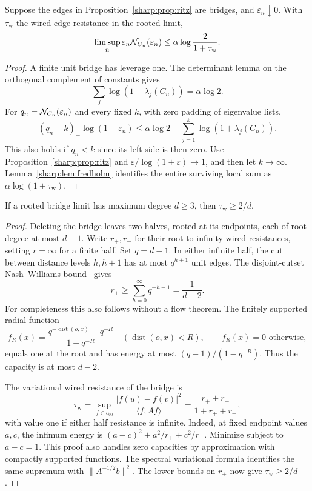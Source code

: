 \begin{theorem}\label{sharp:thm:budget}
Suppose the edges in Proposition~\ref{sharp:prop:ritz} are bridges, and
$\varepsilon_n\downarrow0$. With $\tau_{\mathrm w}$ the wired edge
resistance in the rooted limit,
\begin{equation}\label{sharp:eq:budget}
 \limsup_n\varepsilon_n\mathcal N_{C_n}(\varepsilon_n)
                \le\alpha\log\frac{2}{1+\tau_{\mathrm w}}.
\end{equation}
\end{theorem}
\begin{proof}
A finite unit bridge has leverage one. The determinant lemma on the
orthogonal complement of constants gives
\[
             \sum_j\log(1+\lambda_j(C_n))=\alpha\log2.
\]
For $q_n=\mathcal N_{C_n}(\varepsilon_n)$ and every fixed $k$, with zero
padding of eigenvalue lists,
\[
 (q_n-k)_+\log(1+\varepsilon_n)
    \le\alpha\log2-\sum_{j=1}^k\log(1+\lambda_j(C_n)).
\]
This also holds if $q_n<k$ since its left side is then zero.
Use Proposition~\ref{sharp:prop:ritz} and
$\varepsilon/\log(1+\varepsilon)\to1$, and then let $k\to\infty$.
Lemma~\ref{sharp:lem:fredholm} identifies the entire surviving local sum as
$\alpha\log(1+\tau_{\mathrm w})$.
\end{proof}

\begin{lemma}\label{sharp:lem:resistance}
If a rooted bridge limit has maximum degree $d\ge3$, then
$\tau_{\mathrm w}\ge2/d$.
\end{lemma}
\begin{proof}
Deleting the bridge leaves two halves, rooted at its endpoints, each
of root degree at most $d-1$. Write $r_+,r_-$ for their root-to-infinity
wired resistances, setting $r=\infty$ for a finite half.
Set $q=d-1$. In either infinite half, the cut between distance levels
$h,h+1$ has at most $q^{h+1}$ unit edges. The disjoint-cutset
Nash--Williams bound~\cite[Section 2.5]{LyonsPeres} gives
\[
                 r_\pm\ge\sum_{h=0}^\infty q^{-h-1}
                                =\frac1{d-2}.
\]
For completeness this also follows without a flow theorem. The
finitely supported radial function
\[
 f_R(x)=\frac{q^{-\operatorname{dist}(o,x)}-q^{-R}}{1-q^{-R}}
   \quad(\operatorname{dist}(o,x)<R),\qquad f_R(x)=0\text{ otherwise},
\]
equals one at the root and has energy at most
$(q-1)/(1-q^{-R})$. Thus the capacity is at most $d-2$.

The variational wired resistance of the bridge is
\[
 \tau_{\mathrm w}
 =\sup_{f\in c_{00}}\frac{|f(u)-f(v)|^2}{\langle f,Af\rangle}
 =\frac{r_++r_-}{1+r_++r_-},
\]
with value one if either half resistance is infinite. Indeed, at
fixed endpoint values $a,c$, the infimum energy is
$(a-c)^2+a^2/r_++c^2/r_-$. Minimize subject to $a-c=1$.
This proof also handles zero capacities by approximation with compactly
supported functions. The spectral variational formula identifies the
same supremum with $\|A^{-1/2}b\|^2$. The lower bounds on $r_\pm$
now give $\tau_{\mathrm w}\ge2/d$.
\end{proof}

